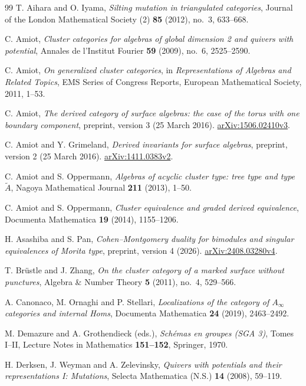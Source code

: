 \documentclass[12pt,a4paper,english,reqno]{amsart}
\theoremstyle{plain}
\theoremstyle{definition}
\numberwithin{equation}{section}
\begin{document}
\begin{thebibliography}{99}
T. Aihara and O. Iyama, \emph{Silting mutation in triangulated categories}, Journal of the London Mathematical Society (2) \textbf{85} (2012), no.~3, 633--668.

C. Amiot, \emph{Cluster categories for algebras of global dimension 2 and quivers with potential}, Annales de l'Institut Fourier \textbf{59} (2009), no.~6, 2525--2590. 

C. Amiot, \emph{On generalized cluster categories}, in \emph{Representations of Algebras and Related Topics}, EMS Series of Congress Reports, European Mathematical Society, 2011, 1--53. 


C. Amiot, \emph{The derived category of surface algebras: the case of the torus with one boundary component}, preprint, version 3 (25 March 2016). \href{https://arxiv.org/abs/1506.02410v3}{arXiv:1506.02410v3}. 

C. Amiot and Y. Grimeland, \emph{Derived invariants for surface algebras}, preprint, version 2 (25 March 2016). \href{https://arxiv.org/abs/1411.0383v2}{arXiv:1411.0383v2}. 

C. Amiot and S. Oppermann, \emph{Algebras of acyclic cluster type: tree type and type $\widetilde A$}, Nagoya Mathematical Journal \textbf{211} (2013), 1--50. 

C. Amiot and S. Oppermann, \emph{Cluster equivalence and graded derived equivalence}, Documenta Mathematica \textbf{19} (2014), 1155--1206.

H. Asashiba and S. Pan, \emph{Cohen--Montgomery duality for bimodules and singular equivalences of Morita type}, preprint, version 4 (2026). \href{https://arxiv.org/abs/2408.03280v4}{arXiv:2408.03280v4}.

T. Br\"ustle and J. Zhang, \emph{On the cluster category of a marked surface without punctures}, Algebra \& Number Theory \textbf{5} (2011), no.~4, 529--566.

A. Canonaco, M. Ornaghi and P. Stellari, \emph{Localizations of the category of $A_\infty$ categories and internal Homs}, Documenta Mathematica \textbf{24} (2019), 2463--2492. 

M. Demazure and A. Grothendieck (eds.), \emph{Sch\'emas en groupes (SGA 3)}, Tomes I--II, Lecture Notes in Mathematics \textbf{151--152}, Springer, 1970.

H. Derksen, J. Weyman and A. Zelevinsky, \emph{Quivers with potentials and their representations I: Mutations}, Selecta Mathematica (N.S.) \textbf{14} (2008), 59--119.


\end{thebibliography}
\end{document}
